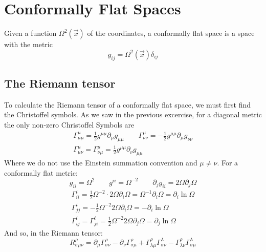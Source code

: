 \documentclass{article}
\begin{document}
\section{Conformally Flat Spaces}
Given a function $\Omega^2(\vec{x})$ of the coordinates, a conformally flat space is a space with the metric
\begin{equation}
    g_{ij} = \Omega^2(\vec{x})\delta_{ij}
\end{equation}
\subsection{The Riemann tensor}
To calculate the Riemann tensor of a conformally flat space, we must first find the Christoffel symbols. As we saw in the previous excercise, for a diagonal metric the only non-zero Christoffel Symbols are
\begin{equation}
\label{eq:christoffel}
\begin{gathered}
    \Gamma^\mu_{\mu\mu} = \frac{1}{2}g^{\mu\mu}\partial_{\mu}g_{\mu\mu}
    \qquad
    \Gamma^\mu_{\nu\nu} = -\frac{1}{2}g^{\mu\mu}\partial_{\mu}g_{\nu\nu}
    \\
    \Gamma^\mu_{\mu\nu} = \Gamma^\mu_{\nu\mu} = \frac{1}{2}g^{\mu\mu}\partial_{\nu}g_{\mu\mu}
\end{gathered}
\end{equation}
Where we do not use the Einstein summation convention and $\mu \ne \nu$. For a conformally flat metric:
\begin{equation}
    g_{ii} = \Omega^2 \qquad g^{ii} = \Omega^{-2} \qquad \partial_j g_{ii} = 2\Omega\partial_j\Omega
\end{equation}
\begin{equation}
\begin{gathered}
    \Gamma^i_{ii} = \frac{1}{2}\Omega^{-2}\cdot2\Omega\partial_i\Omega = \Omega^{-1}\partial_i\Omega = \partial_i \ln \Omega \\
    \Gamma^i_{jj} = -\frac{1}{2}\Omega^{-2}2\Omega\partial_i\Omega = -\partial_i \ln \Omega \\
    \Gamma^i_{ij} = \Gamma^i_{ji} = \frac{1}{2}\Omega^{-2}2\Omega\partial_j \Omega = \partial_j \ln \Omega
\end{gathered}
\end{equation}
And so, in the Riemann tensor:
\begin{equation}
    R^{\rho}_{\sigma\mu\nu} = \partial_\mu\Gamma^\rho_{\sigma\nu} - \partial_\nu\Gamma^\rho_{\sigma\mu} + \Gamma^{\rho}_{\lambda\mu}\Gamma^\lambda_{\sigma\nu} - \Gamma^{\rho}_{\lambda\nu}\Gamma^\lambda_{\sigma\mu}
\end{equation}
\end{document}
